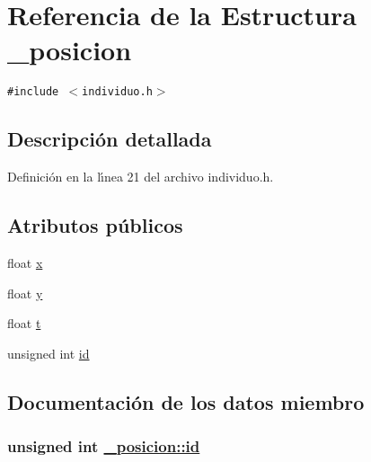 \hypertarget{struct__posicion}{
\section{Referencia de la Estructura \_\-posicion}
\label{struct__posicion}
}
{\tt \#include $<$individuo.h$>$}



\subsection{Descripci\'{o}n detallada}




Definici\'{o}n en la l\'{\i}nea 21 del archivo individuo.h.\subsection*{Atributos p\'{u}blicos}
\begin{CompactItemize}
\item 
float \hyperlink{struct__posicion_71ad085b0f981b64ff6c9736979cf4d0_71ad085b0f981b64ff6c9736979cf4d0}{x}
\item 
float \hyperlink{struct__posicion_82d516a3aa89949f81676cc9bb3bdcab_82d516a3aa89949f81676cc9bb3bdcab}{y}
\item 
float \hyperlink{struct__posicion_f0ba9aedeb816d241a108033f8421536_f0ba9aedeb816d241a108033f8421536}{t}
\item 
unsigned int \hyperlink{struct__posicion_3878a3d9cfd02ea5528901bc2e2a732d_3878a3d9cfd02ea5528901bc2e2a732d}{id}
\end{CompactItemize}


\subsection{Documentaci\'{o}n de los datos miembro}
\hypertarget{struct__posicion_3878a3d9cfd02ea5528901bc2e2a732d_3878a3d9cfd02ea5528901bc2e2a732d}{
\subsubsection[id]{\setlength{\rightskip}{0pt plus 5cm}unsigned int \hyperlink{struct__posicion_3878a3d9cfd02ea5528901bc2e2a732d_3878a3d9cfd02ea5528901bc2e2a732d}{\_\-posicion::id}}}
\label{struct__posicion_3878a3d9cfd02ea5528901bc2e2a732d_3878a3d9cfd02ea5528901bc2e2a732d}





